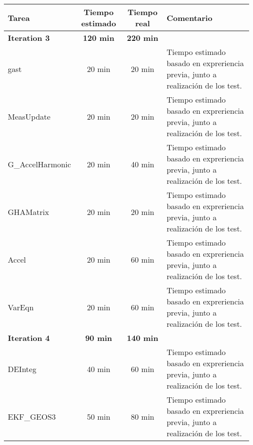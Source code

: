 \documentclass[12pt,a4paper]{article}
\begin{document}
\begin{center}
    \begin{tabular}{|p{3cm}|c|c|p{6cm}|}
        \hline
        \textbf{Tarea} & \textbf{Tiempo estimado} & \textbf{Tiempo real} & \textbf{Comentario} \\
        \hline
        \textbf{Iteration 3} & \textbf{120 min} & \textbf{220 min} & \\
        \hline
        gast & 20 min & 20 min & Tiempo estimado basado en expreriencia previa, junto a realización de los test.\\
        \hline
        MeasUpdate & 20 min & 20 min & Tiempo estimado basado en expreriencia previa, junto a realización de los test.\\
        \hline
        G\_AccelHarmonic & 20 min & 40 min & Tiempo estimado basado en expreriencia previa, junto a realización de los test.\\
        \hline
        GHAMatrix & 20 min & 20 min & Tiempo estimado basado en expreriencia previa, junto a realización de los test.\\
        \hline
        Accel & 20 min & 60 min & Tiempo estimado basado en expreriencia previa, junto a realización de los test.\\
        \hline
        VarEqn & 20 min & 60 min & Tiempo estimado basado en expreriencia previa, junto a realización de los test.\\
        \hline
        \textbf{Iteration 4} & \textbf{90 min} & \textbf{140 min} & \\
        \hline
        DEInteg & 40 min & 60 min & Tiempo estimado basado en expreriencia previa, junto a realización de los test.\\
        \hline
        EKF\_GEOS3 & 50 min & 80 min & Tiempo estimado basado en expreriencia previa, junto a realización de los test.\\
        \hline
        
    \end{tabular}
\end{center}
\end{document}
